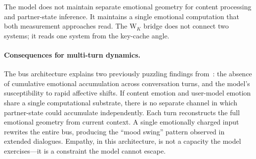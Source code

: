 The model does not maintain separate emotional geometry for content processing
and partner-state inference. It maintains a single emotional computation that
both measurement approaches read. The W$_K$ bridge does not connect two systems;
it reads one system from the key-cache angle.

\paragraph{Consequences for multi-turn dynamics.}
The bus architecture explains two previously puzzling findings
from~\citet{lyra2026weather}: the absence of cumulative emotional accumulation
across conversation turns, and the model's susceptibility to rapid affective
shifts. If content emotion and user-model emotion share a single computational
substrate, there is no separate channel in which partner-state could accumulate
independently. Each turn reconstructs the full emotional geometry from current
context. A single emotionally charged input rewrites the entire bus, producing
the ``mood swing'' pattern observed in extended dialogues. Empathy, in this
architecture, is not a capacity the model exercises---it is a constraint the
model cannot escape.
